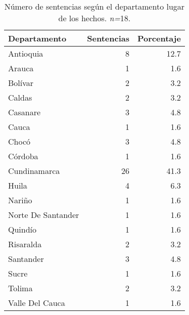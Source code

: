 \begin{table}[H]
\centering
\caption{Número de sentencias según el departamento lugar de los hechos. \textit{n=}18.} 
\label{tab:dephec}
\begin{tabular}{lrr}
  \hline
Departamento & Sentencias & Porcentaje \\ 
  \hline
Antioquia &  8 & 12.7 \\ 
  Arauca &  1 & 1.6 \\ 
  Bolívar &  2 & 3.2 \\ 
  Caldas &  2 & 3.2 \\ 
  Casanare &  3 & 4.8 \\ 
  Cauca &  1 & 1.6 \\ 
  Chocó &  3 & 4.8 \\ 
  Córdoba &  1 & 1.6 \\ 
  Cundinamarca & 26 & 41.3 \\ 
  Huila &  4 & 6.3 \\ 
  Nariño &  1 & 1.6 \\ 
  Norte De Santander &  1 & 1.6 \\ 
  Quindío &  1 & 1.6 \\ 
  Risaralda &  2 & 3.2 \\ 
  Santander &  3 & 4.8 \\ 
  Sucre &  1 & 1.6 \\ 
  Tolima &  2 & 3.2 \\ 
  Valle Del Cauca &  1 & 1.6 \\ 
   \hline
\end{tabular}
\end{table}

